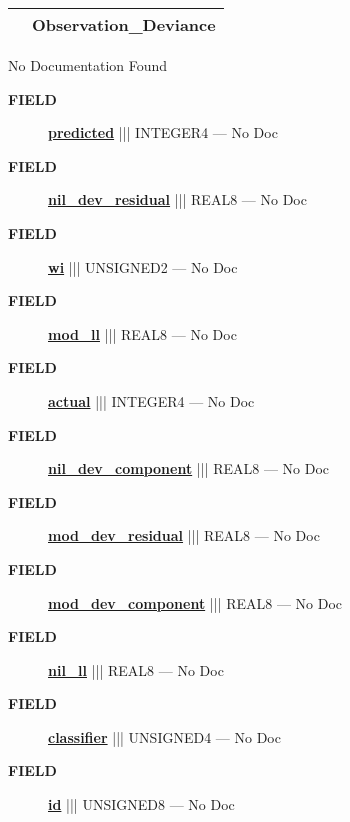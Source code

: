 {\renewcommand{\arraystretch}{1.5}
\begin{tabularx}{\textwidth}{|>{\raggedright\arraybackslash}l|X|}
\hline
\hspace{0pt}\mytexttt{\color{red} } & \textbf{Observation\_Deviance} \\
\hline
\end{tabularx}
}

\par





No Documentation Found







\par
\begin{description}
\item [\colorbox{tagtype}{\color{white} \textbf{\textsf{FIELD}}}] \textbf{\underline{predicted}} ||| INTEGER4 --- No Doc
\item [\colorbox{tagtype}{\color{white} \textbf{\textsf{FIELD}}}] \textbf{\underline{nil\_dev\_residual}} ||| REAL8 --- No Doc
\item [\colorbox{tagtype}{\color{white} \textbf{\textsf{FIELD}}}] \textbf{\underline{wi}} ||| UNSIGNED2 --- No Doc
\item [\colorbox{tagtype}{\color{white} \textbf{\textsf{FIELD}}}] \textbf{\underline{mod\_ll}} ||| REAL8 --- No Doc
\item [\colorbox{tagtype}{\color{white} \textbf{\textsf{FIELD}}}] \textbf{\underline{actual}} ||| INTEGER4 --- No Doc
\item [\colorbox{tagtype}{\color{white} \textbf{\textsf{FIELD}}}] \textbf{\underline{nil\_dev\_component}} ||| REAL8 --- No Doc
\item [\colorbox{tagtype}{\color{white} \textbf{\textsf{FIELD}}}] \textbf{\underline{mod\_dev\_residual}} ||| REAL8 --- No Doc
\item [\colorbox{tagtype}{\color{white} \textbf{\textsf{FIELD}}}] \textbf{\underline{mod\_dev\_component}} ||| REAL8 --- No Doc
\item [\colorbox{tagtype}{\color{white} \textbf{\textsf{FIELD}}}] \textbf{\underline{nil\_ll}} ||| REAL8 --- No Doc
\item [\colorbox{tagtype}{\color{white} \textbf{\textsf{FIELD}}}] \textbf{\underline{classifier}} ||| UNSIGNED4 --- No Doc
\item [\colorbox{tagtype}{\color{white} \textbf{\textsf{FIELD}}}] \textbf{\underline{id}} ||| UNSIGNED8 --- No Doc
\end{description}





